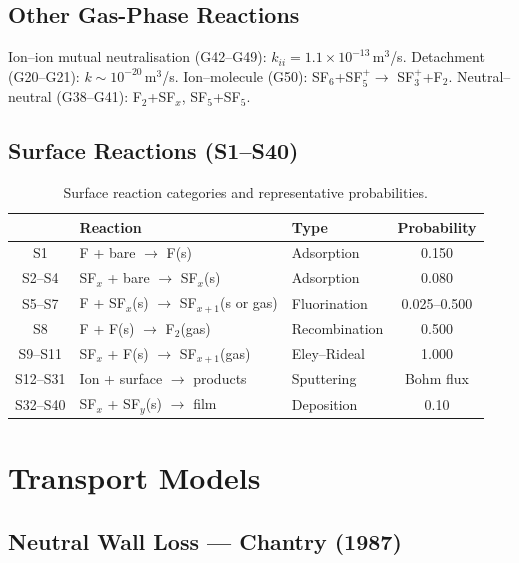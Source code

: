 \documentclass[11pt,a4paper]{report}
\begin{document}
\subsection{Other Gas-Phase Reactions}
\label{sec:pure_other_gas}

Ion--ion mutual neutralisation (G42--G49): $k_{ii} = 1.1\times10^{-13}$\,m$^3$/s.  Detachment (G20--G21): $k \sim 10^{-20}$\,m$^3$/s.  Ion--molecule (G50): SF$_6$+SF$_5^+ \to$ SF$_3^+$+F$_2$.  Neutral--neutral (G38--G41): F$_2$+SF$_x$, SF$_5$+SF$_5$.

\subsection{Surface Reactions (S1--S40)}
\label{sec:pure_surface_rxns}

\begin{table}[H]
\centering\small
\caption{Surface reaction categories and representative probabilities.}
\label{tab:pure_surface}
\begin{tabular}{cllc}
\toprule
& \textbf{Reaction} & \textbf{Type} & \textbf{Probability} \\
\midrule
S1 & F + bare $\to$ F(s) & Adsorption & 0.150 \\
S2--S4 & SF$_x$ + bare $\to$ SF$_x$(s) & Adsorption & 0.080 \\
S5--S7 & F + SF$_x$(s) $\to$ SF$_{x+1}$(s or gas) & Fluorination & 0.025--0.500 \\
S8 & F + F(s) $\to$ F$_2$(gas) & Recombination & 0.500 \\
S9--S11 & SF$_x$ + F(s) $\to$ SF$_{x+1}$(gas) & Eley--Rideal & 1.000 \\
S12--S31 & Ion + surface $\to$ products & Sputtering & Bohm flux \\
S32--S40 & SF$_x$ + SF$_y$(s) $\to$ film & Deposition & 0.10 \\
\bottomrule
\end{tabular}
\end{table}

\section{Transport Models}
\label{sec:pure_transport}

\subsection{Neutral Wall Loss --- Chantry (1987)}
\label{sec:pure_chantry}
\end{document}
